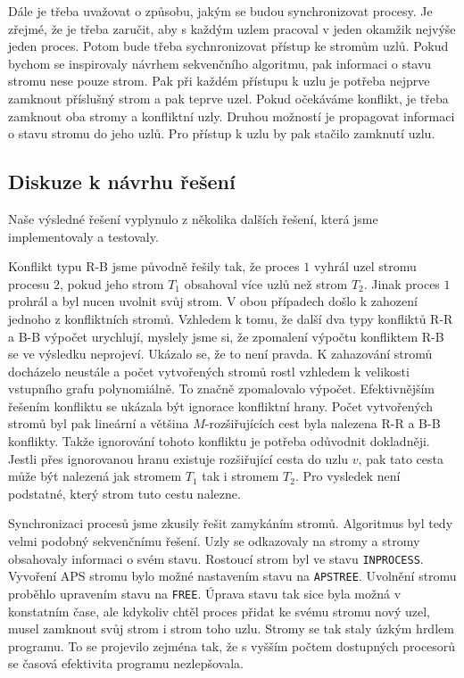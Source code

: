 \documentclass[a4paper, 11pt, titlepage, final]{article}[3. prosinec 2011]
\begin{document}
Dále je třeba uvažovat o způsobu, jakým se budou synchronizovat procesy. Je zřejmé, že je třeba zaručit, aby s každým uzlem pracoval v jeden okamžik nejvýše jeden proces. Potom bude třeba sychnronizovat přístup ke stromům uzlů. Pokud bychom se inspirovaly návrhem sekvenčního algoritmu, pak informaci o stavu stromu nese pouze strom. Pak při každém přístupu k uzlu je potřeba nejprve zamknout příslušný strom a pak teprve uzel. Pokud očekáváme konflikt, je třeba zamknout oba stromy a konfliktní uzly. Druhou možností je propagovat informaci o stavu stromu do jeho uzlů. Pro přístup k uzlu by pak stačilo zamknutí uzlu.

\subsection{Diskuze k návrhu řešení}

Naše výsledné řešení vyplynulo z několika dalších řešení, která jsme implementovaly a testovaly. 

Konflikt typu R-B jsme původně řešily tak, že proces $1$ vyhrál uzel stromu procesu $2$, pokud jeho strom $T_1$ obsahoval více uzlů než strom $T_2$. Jinak proces $1$ prohrál a byl nucen uvolnit svůj strom. V obou případech došlo k zahození jednoho z konfliktních stromů. Vzhledem k tomu, že další dva typy konfliktů R-R a B-B výpočet urychlují, myslely jsme si, že zpomalení výpočtu konfliktem R-B se ve výsledku neprojeví. Ukázalo se, že to není pravda. K zahazování stromů docházelo neustále a počet vytvořených stromů rostl vzhledem k velikosti vstupního grafu polynomiálně. To značně zpomalovalo výpočet. Efektivnějším řešením konfliktu se ukázala být ignorace konfliktní hrany. Počet vytvořených stromů byl pak lineární a většina $M$-rozšiřujících cest byla nalezena R-R a B-B konflikty. Takže ignorování tohoto konfliktu je potřeba odůvodnit dokladněji. Jestli přes ignorovanou hranu existuje rozšiřující cesta do uzlu $v$, pak tato cesta může být nalezená jak stromem $T_1$ tak i stromem $T_2$. Pro vysledek není podstatné, který strom tuto cestu nalezne. 

Synchronizaci procesů jsme zkusily řešit zamykáním stromů. Algoritmus byl tedy velmi podobný sekvenčnímu řešení. Uzly se odkazovaly na stromy a stromy obsahovaly informaci o svém stavu. Rostoucí strom byl ve stavu \texttt{INPROCESS}. Vyvoření APS stromu bylo možné nastavením stavu na \texttt{APSTREE}. Uvolnění stromu proběhlo upravením stavu na \texttt{FREE}. Úprava stavu tak sice byla možná v konstatním čase, ale kdykoliv chtěl proces přidat ke svému stromu nový uzel, musel zamknout svůj strom i strom toho uzlu. Stromy se tak staly úzkým hrdlem programu. To se projevilo zejména tak, že s vyšším počtem dostupných procesorů se časová efektivita programu nezlepšovala.
\end{document}
